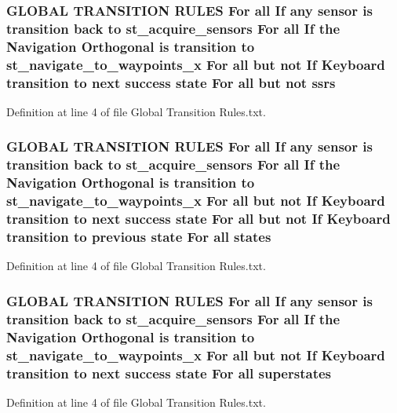 \subsubsection[{\texorpdfstring{ssrs}{ssrs}}]{\setlength{\rightskip}{0pt plus 5cm}G\+L\+O\+B\+AL T\+R\+A\+N\+S\+I\+T\+I\+ON R\+U\+L\+ES For all If any sensor is transition back to st\+\_\+acquire\+\_\+sensors For all If the Navigation {\bf Orthogonal} is transition to st\+\_\+navigate\+\_\+to\+\_\+waypoints\+\_\+x For all but not If Keyboard transition to next success state For all but not ssrs}\hypertarget{3_2docs_2Global_01Transition_01Rules_8txt_aa881c6a22397113c3342bf4c44212934}{}\label{3_2docs_2Global_01Transition_01Rules_8txt_aa881c6a22397113c3342bf4c44212934}


Definition at line 4 of file Global Transition Rules.\+txt.

\subsubsection[{\texorpdfstring{states}{states}}]{\setlength{\rightskip}{0pt plus 5cm}G\+L\+O\+B\+AL T\+R\+A\+N\+S\+I\+T\+I\+ON R\+U\+L\+ES For all If any sensor is transition back to st\+\_\+acquire\+\_\+sensors For all If the Navigation {\bf Orthogonal} is transition to st\+\_\+navigate\+\_\+to\+\_\+waypoints\+\_\+x For all but not If Keyboard transition to next success state For all but not If Keyboard transition to previous state For all states}\hypertarget{3_2docs_2Global_01Transition_01Rules_8txt_a54d1602740c77675ed14ebfe688f4374}{}\label{3_2docs_2Global_01Transition_01Rules_8txt_a54d1602740c77675ed14ebfe688f4374}


Definition at line 4 of file Global Transition Rules.\+txt.

\subsubsection[{\texorpdfstring{superstates}{superstates}}]{\setlength{\rightskip}{0pt plus 5cm}G\+L\+O\+B\+AL T\+R\+A\+N\+S\+I\+T\+I\+ON R\+U\+L\+ES For all If any sensor is transition back to st\+\_\+acquire\+\_\+sensors For all If the Navigation {\bf Orthogonal} is transition to st\+\_\+navigate\+\_\+to\+\_\+waypoints\+\_\+x For all but not If Keyboard transition to next success state For all superstates}\hypertarget{3_2docs_2Global_01Transition_01Rules_8txt_af31ae27f561335eed0d5161d8ee256f8}{}\label{3_2docs_2Global_01Transition_01Rules_8txt_af31ae27f561335eed0d5161d8ee256f8}


Definition at line 4 of file Global Transition Rules.\+txt.

